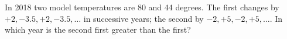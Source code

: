 In 2018 two model temperatures are 80 and 44 degrees. The first changes by $+2,-3.5,+2,-3.5,\ldots $ in successive years; the second by $-2,+5,-2,+5,\ldots $. In which year is the second first greater than the first?
